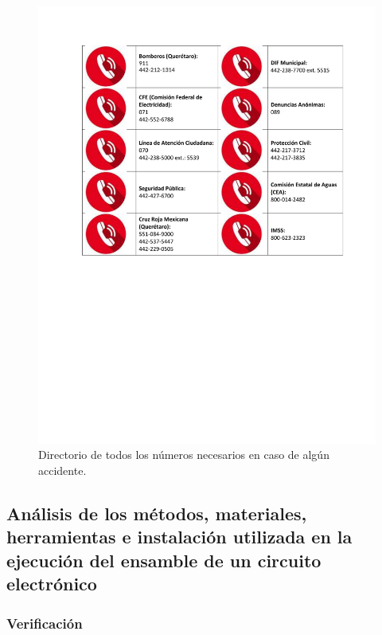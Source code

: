 \begin{figure}[H]
    \centering
    \includegraphics[trim = {25mm 120mm 20mm 20mm},clip,scale=0.5]{19/Img/directorioSeguridad.pdf}
    \caption{Directorio de todos los números necesarios en caso de algún accidente.}
    \label{fig:directorioSeguridad}
\end{figure}

     \subsection{Análisis de los métodos, materiales, herramientas e instalación utilizada en la ejecución del ensamble de un circuito electrónico}
\subsubsection{Verificación}
    

